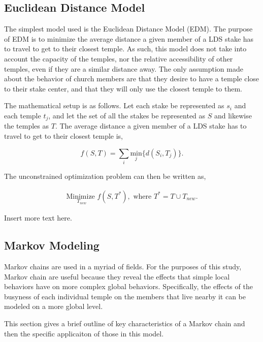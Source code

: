 \documentclass[twoside,twocolumn]{article}
\begin{document}
\subsection{Euclidean Distance Model} %

The simplest model used is the Euclidean Distance Model (EDM). The purpose of EDM is to minimize the average distance a given member of a LDS stake has to travel to get to their closest temple. As such, this model does not take into account the capacity of the temples, nor the relative accessibility of other temples, even if they are a similar distance away. The only assumption made about the behavior of church members are that they desire to have a temple close to their stake center, and that they will only use the closest temple to them.

The mathematical setup is as follows. Let each stake be represented as $s_i$ and each temple $t_j$, and let the set of all the stakes be represented as $S$ and likewise the temples as $T$. The average distance a given member of a LDS stake has to travel to get to their closest temple is, 

\begin{equation}
	f(S,T) = \sum_i \underset{j}{\text{min}}\{d(S_i,T_j)\}.
\end{equation}

The unconstrained optimization problem can then be written as,

\begin{equation}
\begin{aligned}
	\underset{T_{new}}{\text{Minimize }} f(S,T^*), \text{ where } T^* = T \cup T_{new}.
\end{aligned}
\end{equation}

Insert more text here.


\subsection{Markov Modeling}

Markov chains are used in a myriad of fields. For the purposes of this study, Markov chain are useful because they reveal the effects that simple local behaviors have on more complex global behaviors. Specifically, the effects of the busyness of each individual temple on the members that live nearby it can be modeled on a more global level.

This section gives a brief outline of key characteristics of a Markov chain and then the specific applicaiton of those in this model.
\end{document}

